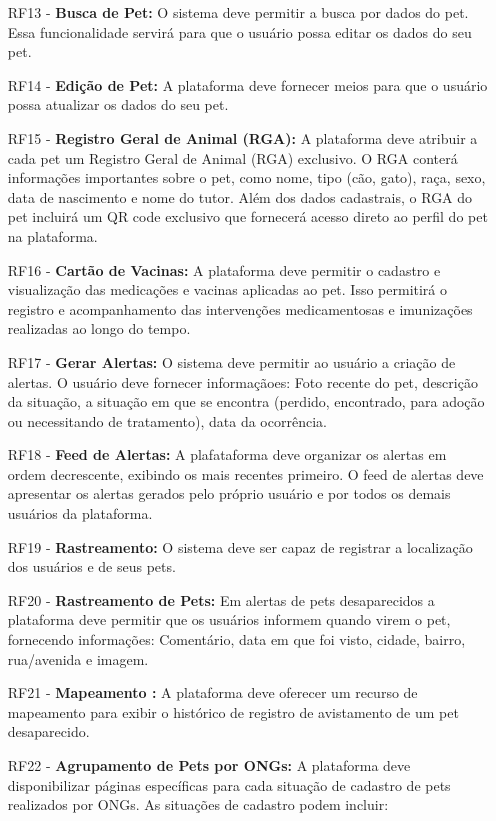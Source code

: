 \begin{itemize}[leftmargin=2cm]
\item[RF13 -] {\bf Busca de Pet:} O sistema deve permitir a busca por dados do pet. Essa funcionalidade servirá para que o usuário possa editar os dados do seu pet.
\item[RF14 -] {\bf Edição de Pet:} A plataforma deve fornecer meios para que o usuário possa atualizar os dados do seu pet.
\item[RF15 -] {\bf Registro Geral de Animal (RGA):} A plataforma deve atribuir a cada pet um Registro Geral de Animal (RGA) exclusivo. O RGA conterá informações importantes sobre o pet, como nome, tipo (cão, gato), raça, sexo, data de nascimento e nome do tutor. Além dos dados cadastrais, o RGA do pet incluirá um QR code exclusivo que fornecerá acesso direto ao perfil do pet na plataforma.
\item[RF16 -] {\bf Cartão de Vacinas:} A plataforma deve permitir o cadastro e visualização das medicações e vacinas aplicadas ao pet. Isso permitirá o registro e acompanhamento das intervenções medicamentosas e imunizações realizadas ao longo do tempo.
\item[RF17 -] {\bf Gerar Alertas:} O sistema deve permitir ao usuário a criação de alertas. O usuário deve fornecer informaçãoes: Foto recente do pet, descrição da situação, a situação em que se encontra (perdido, encontrado, para adoção ou necessitando de tratamento), data da ocorrência.
\item[RF18 -] {\bf Feed de Alertas:} A plafataforma deve organizar os alertas em ordem decrescente,  exibindo os mais recentes primeiro. O feed de alertas deve apresentar os alertas gerados pelo próprio usuário e por todos os demais usuários da plataforma.
\item[RF19 -] {\bf Rastreamento:} O sistema deve ser capaz de registrar a localização dos usuários e de seus pets. 
\item[RF20 -] {\bf Rastreamento de Pets:} Em alertas de pets desaparecidos a plataforma deve permitir que os usuários informem quando virem o pet, fornecendo informações: Comentário, data em que foi visto, cidade, bairro, rua/avenida e imagem.
\item[RF21 -] {\bf Mapeamento :} A plataforma deve oferecer um recurso de mapeamento para exibir o histórico de registro de avistamento de um pet desaparecido.
\item[RF22 -] {\bf Agrupamento de Pets por ONGs:} A plataforma deve disponibilizar páginas específicas para cada situação de cadastro de pets realizados por ONGs. As situações de cadastro podem incluir:

\end{itemize}

